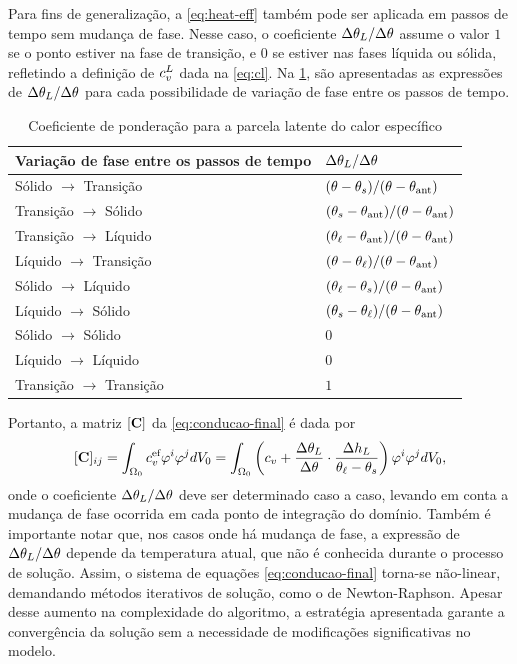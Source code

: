 \documentclass[Tese.tex]{subfiles}
\begin{document}
Para fins de generalização, a \cref{eq:heat-eff} também pode ser aplicada em passos de tempo sem mudança de fase. Nesse caso, o coeficiente ${\Delta\theta_{L}}/{\Delta\theta}$ assume o valor $1$ se o ponto estiver na fase de transição, e $0$ se estiver nas fases líquida ou sólida, refletindo a definição de $c_v^L$ dada na \cref{eq:cl}. Na \cref{tab:coeficiente-ponderador-latente}, são apresentadas as expressões de ${\Delta\theta_{L}}/{\Delta\theta}$ para cada possibilidade de variação de fase entre os passos de tempo.


\begin{table}[!htb]
	\centering
	\caption{Coeficiente de ponderação para a parcela latente do calor específico}
	\small
	\label{tab:coeficiente-ponderador-latente}
	{\def\arraystretch{1.5}
		\begin{tabular}{ll}
			\hline
			Variação de fase entre os passos de tempo & ${\Delta\theta_{L}}/{\Delta\theta}$ \\ \hline
			Sólido $\rightarrow$ Transição & $(\theta - \theta_s)/(\theta-\theta_\text{ant})$ \\
			Transição $\rightarrow$ Sólido & $(\theta_s - \theta_\text{ant})/(\theta-\theta_\text{ant})$ \\ 
			Transição $\rightarrow$ Líquido & $(\theta_\ell - \theta_\text{ant})/(\theta-\theta_\text{ant})$ \\ 
			Líquido $\rightarrow$ Transição & $(\theta - \theta_\ell)/(\theta-\theta_\text{ant})$ \\ 
			Sólido $\rightarrow$ Líquido & $(\theta_\ell - \theta_s)/(\theta-\theta_\text{ant})$ \\ 
			Líquido $\rightarrow$ Sólido & $(\theta_s - \theta_\ell)/(\theta-\theta_\text{ant})$ \\
			Sólido $\rightarrow$ Sólido & $0$ \\
			Líquido $\rightarrow$ Líquido & $0$ \\
			Transição $\rightarrow$ Transição & $1$ \\ \hline
		\end{tabular}\;
	}
\end{table}

Portanto, a matriz $[\mathbf{C}]$ da \cref{eq:conducao-final} é dada por
\begin{equation}
[\mathbf{C}]_{ij} = \int_{\Omega_0}c_v^\text{ef}\varphi^i\varphi^j dV_0 = \int_{\Omega_0}\left(c_v + \dfrac{\Delta\theta_{L}}{\Delta\theta}\cdot\dfrac{\Delta h_L}{\theta_\ell-\theta_s}\right)\varphi^i\varphi^j dV_0,
\end{equation}
onde o coeficiente ${\Delta\theta_{L}}/{\Delta\theta}$ deve ser determinado caso a caso, levando em conta a mudança de fase ocorrida em cada ponto de integração do domínio. Também é importante notar que, nos casos onde há mudança de fase, a expressão de ${\Delta\theta_{L}}/{\Delta\theta}$ depende da temperatura atual, que não é conhecida durante o processo de solução. Assim, o sistema de equações \eqref{eq:conducao-final} torna-se não-linear, demandando métodos iterativos de solução, como o de Newton-Raphson. Apesar desse aumento na complexidade do algoritmo, a estratégia apresentada garante a convergência da solução sem a necessidade de modificações significativas no modelo. 
\end{document}
